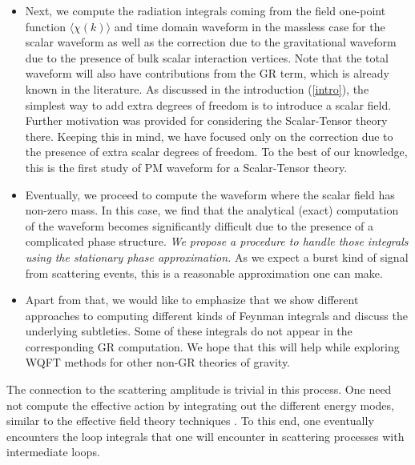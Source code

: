 \begin{itemize}
\item Next, we compute the radiation integrals coming from the field one-point function $\langle\chi(k)\rangle$ and time domain waveform in the massless case for the scalar waveform as well as the correction due to the gravitational waveform due to the presence of bulk scalar interaction vertices. Note that the total waveform will also have contributions from the GR term, which is already known in the literature. As discussed in the introduction (\ref{intro}), the simplest way to add extra degrees of freedom is to introduce a scalar field. Further motivation was provided for considering the Scalar-Tensor theory there. Keeping this in mind, we have focused only on the correction due to the presence of extra scalar degrees of freedom. To the best of our knowledge, this is the first study of PM waveform for a Scalar-Tensor theory. 
\item Eventually, we proceed to compute the waveform where the scalar field has non-zero mass. In this case, we find that the analytical (exact) computation of the waveform becomes significantly difficult due to the presence of a complicated phase structure. \textit{We propose a procedure to handle those integrals using the stationary phase approximation.} As we expect a burst kind of signal from scattering events, this is a reasonable approximation one can make. 
    \item Apart from that, we would like to emphasize that we show different approaches to computing different kinds of Feynman integrals and discuss the underlying subtleties. Some of these integrals do not appear in the corresponding GR computation. We hope that this will help while exploring WQFT methods for other non-GR theories of gravity. 
\end{itemize}
The connection to the scattering amplitude is trivial in this process. One need not compute the effective action by integrating out the different energy modes, similar to the effective field theory techniques \cite{Bhattacharyya:2023kbh}. To this end, one eventually encounters the loop integrals that one will encounter in scattering processes with intermediate loops.
